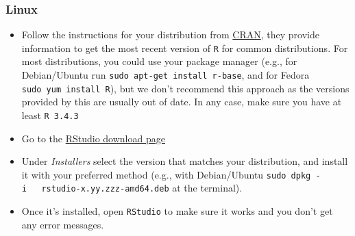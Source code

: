 \documentclass[
]{article}
\providecommand{\tightlist}{%
  \setlength{\itemsep}{0pt}\setlength{\parskip}{0pt}}
\begin{document}
\subsubsection{Linux}\label{linux}

\begin{itemize}
\tightlist
\item
  Follow the instructions for your distribution from
  \href{https://cloud.r-project.org/bin/linux}{CRAN}, they provide
  information to get the most recent version of \texttt{R} for common
  distributions. For most distributions, you could use your package
  manager (e.g., for Debian/Ubuntu run
  \texttt{sudo\ apt-get\ install\ r-base}, and for Fedora
  \texttt{sudo\ yum\ install\ R}), but we don't recommend this approach
  as the versions provided by this are usually out of date. In any case,
  make sure you have at least \texttt{R\ 3.4.3}
\item
  Go to the
  \href{https://www.rstudio.com/products/rstudio/download/\#download}{RStudio
  download page}
\item
  Under \emph{Installers} select the version that matches your
  distribution, and install it with your preferred method (e.g., with
  Debian/Ubuntu \texttt{sudo\ dpkg\ -i\ \ \ rstudio-x.yy.zzz-amd64.deb}
  at the terminal).
\item
  Once it's installed, open \texttt{RStudio} to make sure it works and
  you don't get any error messages.
\end{itemize}
\end{document}
